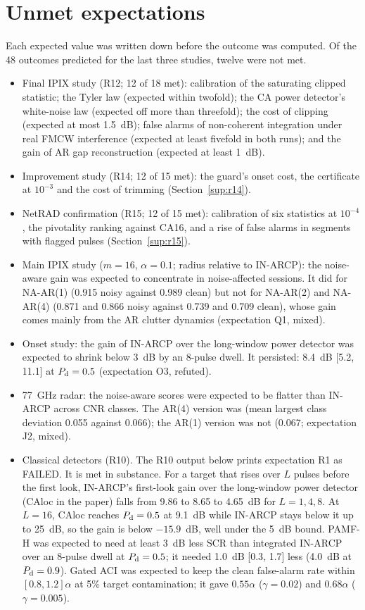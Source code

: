 \documentclass[10pt]{article}
\begin{document}
\section{Unmet expectations}\label{sup:unmet}
Each expected value was written down before the outcome was computed. Of the 48 outcomes predicted for the last three studies, twelve were not met.
\begin{itemize}
\item Final IPIX study (R12; 12 of 18 met): calibration of the saturating clipped statistic; the Tyler law (expected within twofold); the CA power detector's white-noise law (expected off more than threefold); the cost of clipping (expected at most 1.5~dB); false alarms of non-coherent integration under real FMCW interference (expected at least fivefold in both runs); and the gain of AR gap reconstruction (expected at least 1~dB).
\item Improvement study (R14; 12 of 15 met): the guard's onset cost, the certificate at $10^{-3}$ and the cost of trimming (Section~\ref{sup:r14}).
\item NetRAD confirmation (R15; 12 of 15 met): calibration of six statistics at $10^{-4}$, the pivotality ranking against CA16, and a rise of false alarms in segments with flagged pulses (Section~\ref{sup:r15}).
\item Main IPIX study ($m=16$, $\alpha=0.1$; radius relative to IN-ARCP): the noise-aware gain was expected to concentrate in noise-affected sessions. It did for NA-AR(1) (0.915 noisy against 0.989 clean) but not for NA-AR(2) and NA-AR(4) (0.871 and 0.866 noisy against 0.739 and 0.709 clean), whose gain comes mainly from the AR clutter dynamics (expectation Q1, mixed).
\item Onset study: the gain of IN-ARCP over the long-window power detector was expected to shrink below 3~dB by an 8-pulse dwell. It persisted: 8.4~dB [5.2, 11.1] at $P_{\rm d}=0.5$ (expectation O3, refuted).
\item 77~GHz radar: the noise-aware scores were expected to be flatter than IN-ARCP across CNR classes. The AR(4) version was (mean largest class deviation 0.055 against 0.066); the AR(1) version was not (0.067; expectation J2, mixed).
\item Classical detectors (R10). The R10 output below prints expectation R1 as FAILED. It is met in substance. For a target that rises over $L$ pulses before the first look, IN-ARCP's first-look gain over the long-window power detector (CAloc in the paper) falls from 9.86 to 8.65 to 4.65~dB for $L=1,4,8$. At $L=16$, CAloc reaches $P_{\rm d}=0.5$ at 9.1~dB while IN-ARCP stays below it up to 25~dB, so the gain is below $-15.9$~dB, well under the 5~dB bound. PAMF-H was expected to need at least 3~dB less SCR than integrated IN-ARCP over an 8-pulse dwell at $P_{\rm d}=0.5$; it needed 1.0~dB [0.3, 1.7] less (4.0~dB at $P_{\rm d}=0.9$). Gated ACI was expected to keep the clean false-alarm rate within $[0.8,1.2]\alpha$ at 5\% target contamination; it gave $0.55\alpha$ ($\gamma=0.02$) and $0.68\alpha$ ($\gamma=0.005$).

\end{itemize}
\end{document}
